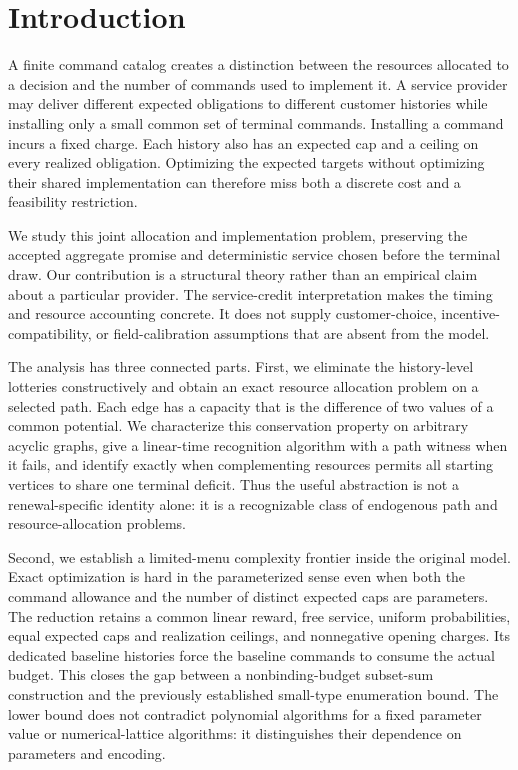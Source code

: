 \section{Introduction}
A finite command catalog creates a distinction between the resources allocated to a decision and the number of commands used to implement it. A service provider may deliver different expected obligations to different customer histories while installing only a small common set of terminal commands. Installing a command incurs a fixed charge. Each history also has an expected cap and a ceiling on every realized obligation. Optimizing the expected targets without optimizing their shared implementation can therefore miss both a discrete cost and a feasibility restriction.

We study this joint allocation and implementation problem, preserving the accepted aggregate promise and deterministic service chosen before the terminal draw. Our contribution is a structural theory rather than an empirical claim about a particular provider. The service-credit interpretation makes the timing and resource accounting concrete. It does not supply customer-choice, incentive-compatibility, or field-calibration assumptions that are absent from the model.

The analysis has three connected parts. First, we eliminate the history-level lotteries constructively and obtain an exact resource allocation problem on a selected path. Each edge has a capacity that is the difference of two values of a common potential. We characterize this conservation property on arbitrary acyclic graphs, give a linear-time recognition algorithm with a path witness when it fails, and identify exactly when complementing resources permits all starting vertices to share one terminal deficit. Thus the useful abstraction is not a renewal-specific identity alone: it is a recognizable class of endogenous path and resource-allocation problems.

Second, we establish a limited-menu complexity frontier inside the original model. Exact optimization is hard in the parameterized sense even when both the command allowance and the number of distinct expected caps are parameters. The reduction retains a common linear reward, free service, uniform probabilities, equal expected caps and realization ceilings, and nonnegative opening charges. Its dedicated baseline histories force the baseline commands to consume the actual budget. This closes the gap between a nonbinding-budget subset-sum construction and the previously established small-type enumeration bound. The lower bound does not contradict polynomial algorithms for a fixed parameter value or numerical-lattice algorithms: it distinguishes their dependence on parameters and encoding.

